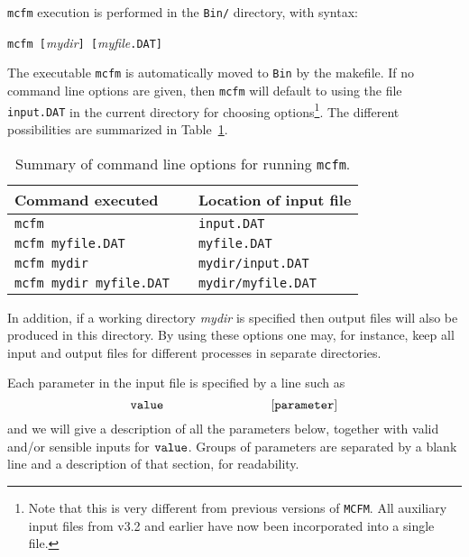 \documentclass[12pt]{article}
\begin{document}
{\tt mcfm} execution is performed in the {\tt Bin/} directory,
with syntax:
\begin{center}
{\tt mcfm [}{\it mydir}{\tt ] [}{\it myfile}{\tt .DAT]}
\end{center}
The executable {\tt mcfm} is automatically moved to {\tt Bin} by the makefile.
If no command line options are given, then {\tt mcfm} will default
to using the file {\tt input.DAT} in the current directory for
choosing options\footnote{Note that this is very different from
previous versions of {\tt MCFM}. All auxiliary input files from v3.2 and
earlier have now been incorporated into a single file.}.
The different possibilities are summarized in Table~\ref{clopts}.
\begin{table}
\begin{center}
\begin{tabular}{l|cl}
Command executed && Location of input file \\
\hline
{\tt mcfm}                      && {\tt input.DAT} \\
{\tt mcfm myfile.DAT}           && {\tt myfile.DAT} \\
{\tt mcfm mydir}                && {\tt mydir/input.DAT} \\
{\tt mcfm mydir myfile.DAT}     && {\tt mydir/myfile.DAT} \\
\end{tabular}
\end{center}
\caption{Summary of command line options for running {\tt mcfm}.}
\label{clopts}
\end{table}
In addition, if a working directory {\it mydir} is specified then
output files will also be produced in this directory. By using these
options one may, for instance, keep all input and output files for
different processes in separate directories.

Each parameter in the input file is specified by a line such as
\begin{displaymath}
{\tt value} \hspace{3cm} {\tt [parameter]}
\end{displaymath}
and we will give a description of all the parameters below, together with
valid and/or sensible inputs for ${\tt value}$. Groups of parameters
are separated by a blank line and a description of that section, for
readability.
\end{document}
